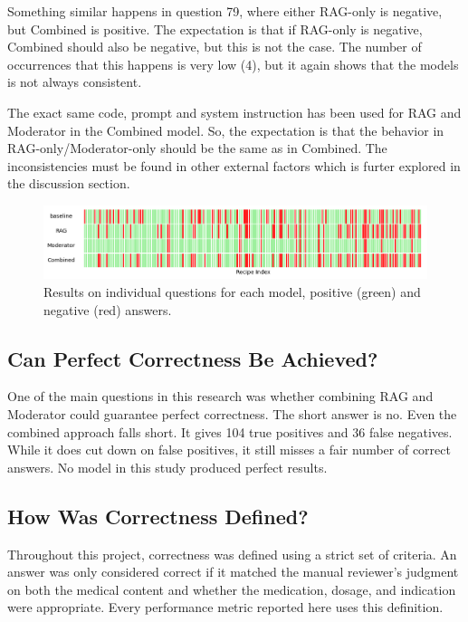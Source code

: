Something similar happens in question 79, where either RAG-only is negative, but Combined is positive.
The expectation is that if RAG-only is negative, Combined should also be negative, but this is not the case.
The number of occurrences that this happens is very low (4), but it again shows that the models is not always consistent.

The exact same code, prompt and system instruction has been used for RAG and Moderator in the Combined model.
So, the expectation is that the behavior in RAG-only/Moderator-only should be the same as in Combined.
The inconsistencies must be found in other external factors which is furter explored in the discussion section.

\begin{figure}[H]
    \includegraphics[width=1\linewidth]{figures/dna-results.png}
    \caption{Results on individual questions for each model, positive (green) and negative (red) answers.}
    \label{fig:dna-results}
\end{figure}

\subsection{Can Perfect Correctness Be Achieved?}

One of the main questions in this research was whether combining RAG and Moderator could guarantee perfect correctness. The short answer is no. Even the combined approach falls short. It gives 104 true positives and 36 false negatives. While it does cut down on false positives, it still misses a fair number of correct answers. No model in this study produced perfect results.

\subsection{How Was Correctness Defined?}

Throughout this project, correctness was defined using a strict set of criteria. An answer was only considered correct if it matched the manual reviewer's judgment on both the medical content and whether the medication, dosage, and indication were appropriate. Every performance metric reported here uses this definition.

